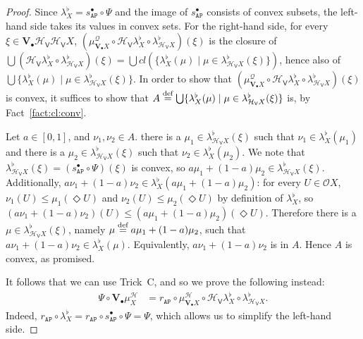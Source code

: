 \documentclass[preprint,12pt]{elsarticle}
\newcommand\eqdef{\mathrel{\buildrel \text{def}\over=}}
\newcommand\Angel{{\mathtt{A}}}
\newcommand\Nature{{\mathtt{P}}}
\newcommand\AN{{\Angel\Nature}}
\newcommand\Smyth{{\mathcal Q}}
\newcommand\Hoare{{\mathcal H}}
\newcommand\Vt{\mathsf{V}}
\newcommand\HV{\Hoare_\Vt}
\newcommand\Val{{\mathbf V}}
\newcommand\Open{{\mathcal O}}
\begin{document}
\begin{proof}
  Since ${\lambda^\flat_X} = s_\AN^\bullet \circ \Psi$ and the image
  of $s_\AN^\bullet$ consists of convex subsets, the left-hand side
  takes its values in convex sets.  For the right-hand side, for every
  $\xi \in \Val_\bullet {\HV {\HV X}}$,
  $(\mu^\Smyth_{\Val_\bullet X} \circ \HV {\lambda^\flat_X} \circ
  \lambda^\flat_{\HV X}) (\xi)$ is the closure of
  $\bigcup (\HV {\lambda^\flat_X} \circ \lambda^\flat_{\HV X}) (\xi) =
  \bigcup cl (\{\lambda^\flat_X (\mu) \mid \mu \in \lambda^\flat_{\HV X}
  (\xi)\})$, hence also of
  $\bigcup \{\lambda^\flat_X (\mu) \mid \mu \in \lambda^\flat_{\HV X}
  (\xi)\}$.  In order to show that
  $(\mu^\Smyth_{\Val_\bullet X} \circ \HV {\lambda^\flat_X} \circ
  \lambda^\flat_{\HV X}) (\xi)$ is convex, it suffices to show that
  $A \eqdef \bigcup \{\lambda^\flat_X (\mu) \mid \mu \in \lambda^\flat_{\HV X}
  (\xi)\}$ is, by Fact~\ref{fact:cl:conv}.
  
  Let $a \in [0, 1]$, and $\nu_1, \nu_2 \in A$.  there is a
  $\mu_1 \in \lambda^\flat_{\HV X} (\xi)$ such that
  $\nu_1 \in {\lambda^\flat_X} (\mu_1)$ and there is a
  $\mu_2 \in \lambda^\flat_{\HV X} (\xi)$ such that
  $\nu_2 \in {\lambda^\flat_X} (\mu_2)$.  We note that
  $\lambda^\flat_{\HV X} (\xi) = (s_\AN^\bullet \circ \Psi) (\xi)$ is
  convex, so $a\mu_1 + (1-a)\mu_2 \in \lambda^\flat_{\HV X} (\xi)$.
  Additionally,
  $a\nu_1 + (1-a)\nu_2 \in {\lambda^\flat_X} (a\mu_1 + (1-a)\mu_2)$:
  for every $U \in \Open X$, $\nu_1 (U) \leq \mu_1 (\Diamond U)$ and
  $\nu_2 (U) \leq \mu_2 (\Diamond U)$ by definition of
  ${\lambda^\flat_X}$, so
  $(a\nu_1 + (1-a)\nu_2) (U) \leq (a\mu_1 + (1-a) \mu_2) (\Diamond
  U)$.  Therefore there is a $\mu \in \lambda^\flat_{\HV X} (\xi)$,
  namely $\mu \eqdef a\mu_1 + (1-a) \mu_2$, such that
  $a \nu_1 + (1-a) \nu_2 \in {\lambda^\flat_X} (\mu)$.  Equivalently,
  $a \nu_1 + (1-a) \nu_2$ is in $A$.  Hence $A$ is convex, as
  promised.

  It follows that we can use Trick~C, and so we prove the following
  instead:
  \begin{align*}
    \Psi \circ \Val_\bullet {\mu^\Hoare_X}
    & = r_\AN \circ  \mu^\Hoare_{\Val_\bullet X} \circ \HV {\lambda^\flat_X} \circ \lambda^\flat_{\HV X}.
  \end{align*}
  Indeed,
  $r_\AN \circ {\lambda^\flat_X} = r_\AN \circ s_\AN^\bullet \circ \Psi =
  \Psi$, which allows us to simplify the left-hand side.


\end{proof}
\end{document}
